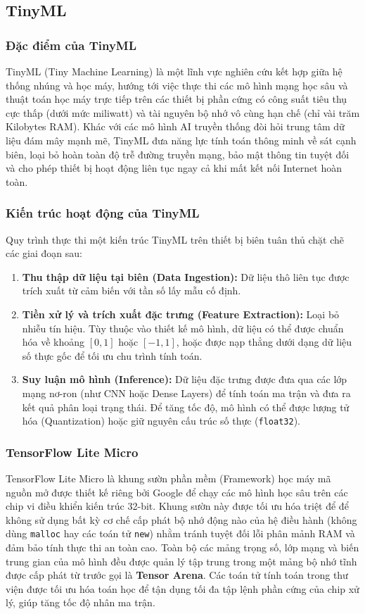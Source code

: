 \subsection{TinyML}

\subsubsection{Đặc điểm của TinyML}
TinyML (Tiny Machine Learning) là một lĩnh vực nghiên cứu kết hợp giữa hệ thống nhúng và học máy, hướng tới việc thực thi các mô hình mạng học sâu và thuật toán học máy trực tiếp trên các thiết bị phần cứng có công suất tiêu thụ cực thấp (dưới mức miliwatt) và tài nguyên bộ nhớ vô cùng hạn chế (chỉ vài trăm Kilobytes RAM). Khác với các mô hình AI truyền thống đòi hỏi trung tâm dữ liệu đám mây mạnh mẽ, TinyML đưa năng lực tính toán thông minh về sát cạnh biên, loại bỏ hoàn toàn độ trễ đường truyền mạng, bảo mật thông tin tuyệt đối và cho phép thiết bị hoạt động liên tục ngay cả khi mất kết nối Internet hoàn toàn.

\subsubsection{Kiến trúc hoạt động của TinyML}
Quy trình thực thi một kiến trúc TinyML trên thiết bị biên tuân thủ chặt chẽ các giai đoạn sau:
\begin{enumerate}
    \item \textbf{Thu thập dữ liệu tại biên (Data Ingestion):} Dữ liệu thô liên tục được trích xuất từ cảm biến với tần số lấy mẫu cố định.
    \item \textbf{Tiền xử lý và trích xuất đặc trưng (Feature Extraction):} Loại bỏ nhiễu tín hiệu. Tùy thuộc vào thiết kế mô hình, dữ liệu có thể được chuẩn hóa về khoảng $[0, 1]$ hoặc $[-1, 1]$, hoặc được nạp thẳng dưới dạng dữ liệu số thực gốc để tối ưu chu trình tính toán.
    \item \textbf{Suy luận mô hình (Inference):} Dữ liệu đặc trưng được đưa qua các lớp mạng nơ-ron (như CNN hoặc Dense Layers) để tính toán ma trận và đưa ra kết quả phân loại trạng thái. Để tăng tốc độ, mô hình có thể được lượng tử hóa (Quantization) hoặc giữ nguyên cấu trúc số thực (\texttt{float32}).
\end{enumerate}

\subsubsection{TensorFlow Lite Micro}
TensorFlow Lite Micro là khung sườn phần mềm (Framework) học máy mã nguồn mở được thiết kế riêng bởi Google để chạy các mô hình học sâu trên các chip vi điều khiển kiến trúc 32-bit. Khung sườn này được tối ưu hóa triệt để để không sử dụng bất kỳ cơ chế cấp phát bộ nhớ động nào của hệ điều hành (không dùng \texttt{malloc} hay các toán tử \texttt{new}) nhằm tránh tuyệt đối lỗi phân mảnh RAM và đảm bảo tính thực thi an toàn cao. Toàn bộ các mảng trọng số, lớp mạng và biến trung gian của mô hình đều được quản lý tập trung trong một mảng bộ nhớ tĩnh được cấp phát từ trước gọi là \textbf{Tensor Arena}. Các toán tử tính toán trong thư viện được tối ưu hóa toán học để tận dụng tối đa tập lệnh phần cứng của chip xử lý, giúp tăng tốc độ nhân ma trận.


